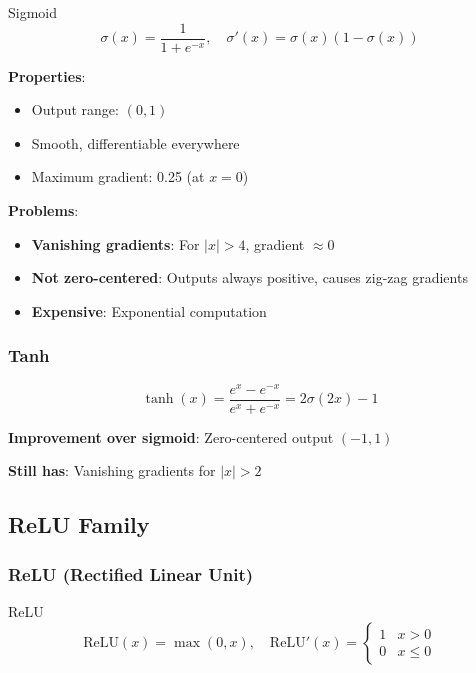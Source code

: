 \begin{mathresult}{Sigmoid}
\begin{equation}
\sigma(x) = \frac{1}{1 + e^{-x}}, \quad \sigma'(x) = \sigma(x)(1 - \sigma(x))
\end{equation}
\end{mathresult}

\textbf{Properties}:
\begin{itemize}
    \item Output range: $(0, 1)$
    \item Smooth, differentiable everywhere
    \item Maximum gradient: 0.25 (at $x=0$)
\end{itemize}

\textbf{Problems}:
\begin{itemize}
    \item \textbf{Vanishing gradients}: For $|x| > 4$, gradient $\approx 0$
    \item \textbf{Not zero-centered}: Outputs always positive, causes zig-zag gradients
    \item \textbf{Expensive}: Exponential computation
\end{itemize}

\subsubsection{Tanh}

\begin{equation}
\tanh(x) = \frac{e^x - e^{-x}}{e^x + e^{-x}} = 2\sigma(2x) - 1
\end{equation}

\textbf{Improvement over sigmoid}: Zero-centered output $(-1, 1)$

\textbf{Still has}: Vanishing gradients for $|x| > 2$

\subsection{ReLU Family}

\subsubsection{ReLU (Rectified Linear Unit)}

\begin{mathresult}{ReLU}
\begin{equation}
\text{ReLU}(x) = \max(0, x), \quad \text{ReLU}'(x) = \begin{cases} 1 & x > 0 \\ 0 & x \leq 0 \end{cases}
\end{equation}
\end{mathresult}

